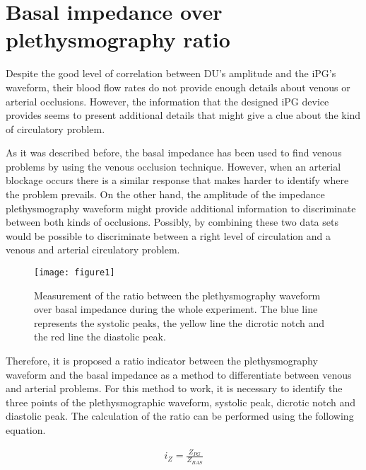 \section{Basal impedance over plethysmography ratio} %
\label{section discussion 2}

Despite the good level of correlation between DU's amplitude and the iPG's waveform, their blood flow rates do not provide enough details about venous or arterial occlusions. However, the information that the designed iPG device provides seems to present additional details that might give a clue about the kind of circulatory problem. 

As it was described before, the basal impedance has been used to find venous problems by using the venous occlusion technique. However, when an arterial blockage occurs there is a similar response that makes harder to identify where the problem prevails. On the other hand, the amplitude of the impedance plethysmography waveform might provide additional information to discriminate between both kinds of occlusions. Possibly, by combining these two data sets would be possible to discriminate between a right level of circulation and a venous and arterial circulatory problem. 

 \begin{figure}[!htpb]
 	\texttt{[image: figure1]}    
 	\caption[Comparison of the ratio of the plethysmography waveform over basal impedance during the whole experiment]{Measurement of the ratio between the plethysmography waveform over basal impedance during the whole experiment. The blue line represents the systolic peaks, the yellow line the dicrotic notch and the red line the diastolic peak.}
 	\label{fig:ratio Z}
 \end{figure}

Therefore, it is proposed a ratio indicator between the plethysmography waveform and the basal impedance as a method to differentiate between venous and arterial problems. For this method to work, it is necessary to identify the three points of the plethysmographic waveform, systolic peak, dicrotic notch and diastolic peak. The calculation of the ratio can be performed using the following equation.

\begin{align}
	\label{eq:ratio Z}
	i_Z = \frac{Z_{PG}}{Z_{BAS}}
\end{align}


